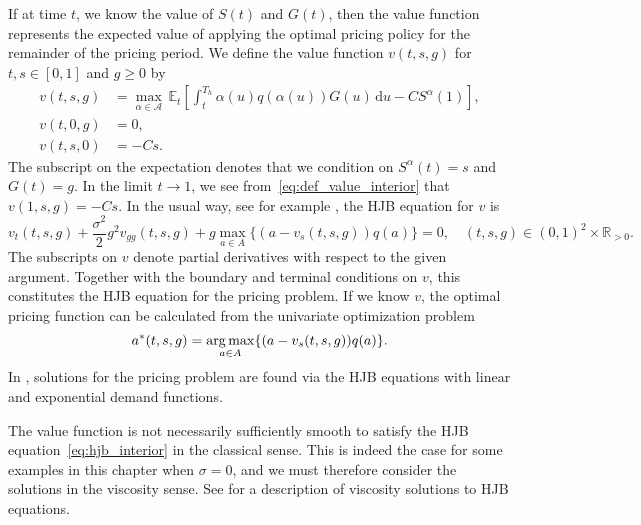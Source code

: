 \documentclass[main.tex]{subfiles}
\begin{document}
If at time $t$, we know the value of $S(t)$ and $G(t)$, then the value
function represents the expected value of applying the optimal pricing
policy for the remainder of the pricing period.
We define the value function $v(t,s,g)$ for $t,s\in[0,1]$ and $g\geq 0$ by
\begin{align}
  v(t,s,g) &=
             \max_{\alpha \in \mathcal A}\,
             \mathbb E_{t}\left[
             \int_t^{T_h}\alpha(u)q(\alpha(u))G(u)\,\mathrm{d}u-CS^\alpha(1)
             \right],\label{eq:def_value_interior}\\
  v(t,0,g)&= 0,\\
  v(t,s,0)&=-Cs.
\end{align}
The subscript on the expectation denotes that we condition on
$S^\alpha(t)=s$ and $G(t)=g$.
In the limit $t\to 1$, we see from~\eqref{eq:def_value_interior} that $v(1,s,g)=-Cs$.
In the usual way, see for example \citet{pham2009continuous}, the HJB equation for $v$ is
\begin{equation}\label{eq:hjb_interior}
  v_t(t,s,g)+\frac{\sigma^2}{2} g^2v_{gg}(t,s,g)
  +g\max_{a\in A}\{(a-v_s(t,s,g))q(a)\} = 0, \quad
  (t,s,g)\in{(0,1)}^2\times\mathbb R_{>0}.
\end{equation}
The subscripts on $v$ denote partial derivatives with respect to the
given argument. Together with the boundary and terminal conditions on
$v$, this constitutes the HJB equation for the pricing problem.
If we know $v$, the optimal pricing function can be calculated from
the univariate optimization problem
\begin{equation}\label{eq:pricing_function_general}
  a^*(t,s,g) = \operatorname*{arg\,max}_{a\in A}\{(a-v_s(t,s,g))q(a)\}.
\end{equation}
In , solutions for the
pricing problem are found via the HJB equations with linear and
exponential demand functions.
\begin{remark}\label{rem:viscosity}
  The value function is not necessarily sufficiently smooth to satisfy
  the HJB equation~\eqref{eq:hjb_interior} in the classical sense.
  This is indeed the case for some examples in this chapter when $\sigma=0$,
  and we must therefore consider
  the solutions in the viscosity sense. See \citet{pham2009continuous}
  for a description of viscosity solutions to HJB equations.
\end{remark}
\end{document}
